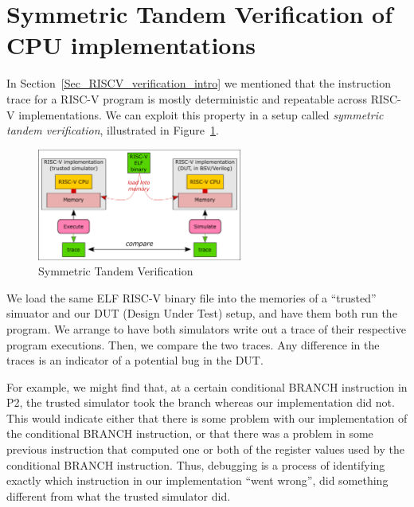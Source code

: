 
\section{Symmetric Tandem Verification of CPU implementations}

\label{Sec_Symmetric_Tandem_Verification}


In Section~\ref{Sec_RISCV_verification_intro} we mentioned that the
instruction trace for a RISC-V program is mostly deterministic and
repeatable across RISC-V implementations.  We can exploit this
property in a setup called \emph{symmetric tandem verification},
illustrated in Figure~\ref{Fig_tandem_verification}.
\begin{figure}[htbp]
  \centerline{\includegraphics[width=0.6\textwidth,angle=0]{Figures/Fig_tandem_verification}}
  \caption{\label{Fig_tandem_verification}
                  Symmetric Tandem Verification}
\end{figure}

We load the same ELF RISC-V binary file into the memories of a
``trusted'' simuator and our DUT (Design Under Test) setup, and have
them both run the program.  We arrange to have both simulators write
out a trace of their respective program executions.  Then, we compare
the two traces. Any difference in the traces is an indicator of a
potential bug in the DUT.

For example, we might find that, at a certain conditional BRANCH
instruction in P2, the trusted simulator took the branch whereas our
implementation did not.  This would indicate either that there is some
problem with our implementation of the conditional BRANCH instruction,
or that there was a problem in some previous instruction that computed
one or both of the register values used by the conditional BRANCH
instruction.  Thus, debugging is a process of identifying exactly
which instruction in our implementation ``went wrong'', {\ie} did
something different from what the trusted simulator did.

